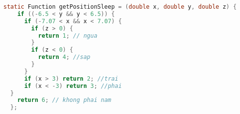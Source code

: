 \begin{lstlisting}[float,language=C,caption=Tập lệnh đánh giá tư thế ngủ bằng ngưỡng, label=nguong,captionpos=b]
static Function getPositionSleep = (double x, double y, double z) {
    if ((-6.5 < y && y < 6.5)) {
      if (-7.07 < x && x < 7.07) {
        if (z > 0) {
          return 1; // ngua
        }
        if (z < 0) {
          return 4; //sap
        }
      }
      if (x > 3) return 2; //trai
      if (x < -3) return 3; //phai
  }
    return 6; // khong phai nam
  };

\end{lstlisting}
